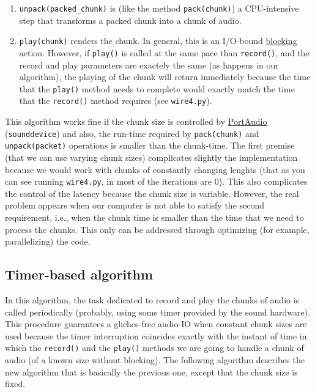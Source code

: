 \begin{enumerate}
\item \verb|unpack(packed_chunk)| is (like the method
  \texttt{pack(chunk)}) a CPU-intensive step that transforms a
  packed chunk into a chunk of audio.

\item \verb|play(chunk)| renders the chunk. In general, this is an
  I/O-bound
  \href{https://python-sounddevice.readthedocs.io/en/0.4.0/api/streams.html#sounddevice.Stream.write}{blocking}
  action. However, if \verb|play()| is called at the same pace
  than \verb|record()|, and the record and play parameters are
  exactely the same (as happens in our algorithm), the playing of the
  chunk will return inmediately because the time that the
  \verb|play()| method needs to complete would exactly match the
  time that the \verb|record()| method requires (see
  \verb|wire4.py|).
\end{enumerate}

This algorithm works fine if the chunk size is controlled by
\href{http://www.portaudio.com/}{PortAudio}~\cite{portaudio}
(\verb|sounddevice|) and also, the run-time required by
\verb|pack(chunk)| and \verb|unpack(packet)| operations is smaller
than the chunk-time. The first premise (that we can use varying chunk
sizes) complicates slightly the implementation because we would work
with chunks of constantly changing lenghts (that as you can see
running \verb|wire4.py|, in most of the iterations are 0). This also
complicates the control of the latency because the chunk size is
variable. However, the real problem appears when our computer is not
able to satisfy the second requirement, i.e., when the chunk time is
smaller than the time that we need to process the chunks. This only
can be addressed through optimizing (for example, parallelizing) the
code.

\subsection{Timer-based algorithm}

In this algorithm, the task dedicated to record and play the chunks of
audio is called periodically (probably, using some timer provided by
the sound hardware). This procedure guarantees a gliches-free audio-IO
when constant chunk sizes are used because the timer interruption
coincides exactly with the instant of time in which the
\verb|record()| and the \verb|play()| methods we are going to
handle a chunk of audio (of a known size without blocking). The
following algorithm describes the new algorithm that is basically the
previous one, except that the chunk size is fixed.

